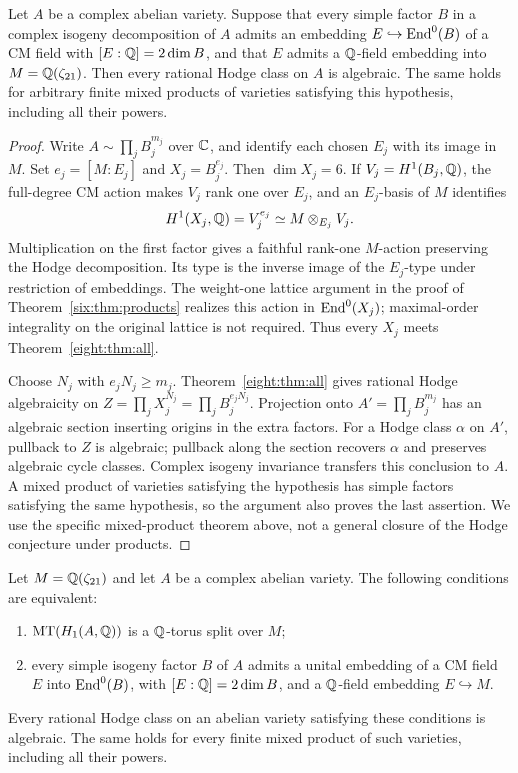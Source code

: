 \begin{corollary}
\label{eight:cor:subfields}
Let $A$ be a complex abelian variety. Suppose that every simple factor $B$
in a complex isogeny decomposition of $A$ admits an embedding
$E\hookrightarrow\operatorname{End}^0(B)$ of a CM field with $[E:\mathbb Q]=2\dim B$,
and that $E$ admits a $\mathbb Q$-field embedding into
$M=\mathbb Q(\zeta_{21})$. Then every rational Hodge class on $A$ is algebraic.
The same holds for arbitrary finite mixed products of varieties satisfying
this hypothesis, including all their powers.
\end{corollary}
\begin{proof}
Write $A\sim\prod_j B_j^{m_j}$ over $\mathbb C$, and identify each chosen
$E_j$ with its image in $M$. Set $e_j=[M:E_j]$ and $X_j=B_j^{e_j}$.
Then $\dim X_j=6$. If $V_j=H^1(B_j,\mathbb Q)$, the full-degree CM action
makes $V_j$ rank one over $E_j$, and an $E_j$-basis of $M$ identifies
\[
 H^1(X_j,\mathbb Q)=V_j^{e_j}\simeq M\otimes_{E_j}V_j.
\]
Multiplication on the first factor gives a faithful rank-one $M$-action
preserving the Hodge decomposition. Its type is the inverse image of the
$E_j$-type under restriction of embeddings. The weight-one lattice argument
in the proof of Theorem~\ref{six:thm:products} realizes this action in
$\operatorname{End}^0(X_j)$; maximal-order integrality on the original lattice is not
required. Thus every $X_j$ meets Theorem~\ref{eight:thm:all}.

Choose $N_j$ with $e_jN_j\geq m_j$. Theorem~\ref{eight:thm:all} gives
rational Hodge algebraicity on
$Z=\prod_j X_j^{N_j}=\prod_j B_j^{e_jN_j}$.
Projection onto $A'=\prod_j B_j^{m_j}$ has an algebraic section inserting
origins in the extra factors. For a Hodge class $\alpha$ on $A'$, pullback
to $Z$ is algebraic; pullback along the section recovers $\alpha$ and
preserves algebraic cycle classes. Complex isogeny invariance transfers
this conclusion to $A$. A mixed product of varieties satisfying the
hypothesis has simple factors satisfying the same hypothesis, so the
argument also proves the last assertion. We use the specific mixed-product
theorem above, not a general closure of the Hodge conjecture under products.
\end{proof}
\begin{corollary}
\label{eight:cor:mt-splitting}
Let $M=\mathbb Q(\zeta_{21})$ and let $A$ be a complex abelian variety.
The following conditions are equivalent:
\begin{enumerate}
\item $\operatorname{MT}(H_1(A,\mathbb Q))$ is a $\mathbb Q$-torus split over $M$;
\item every simple isogeny factor $B$ of $A$ admits a unital embedding
of a CM field $E$ into $\operatorname{End}^0(B)$, with $[E:\mathbb Q]=2\dim B$, and a
$\mathbb Q$-field embedding $E\hookrightarrow M$.
\end{enumerate}
Every rational Hodge class on an abelian variety satisfying these
conditions is algebraic. The same holds for every finite mixed product
of such varieties, including all their powers.
\end{corollary}
